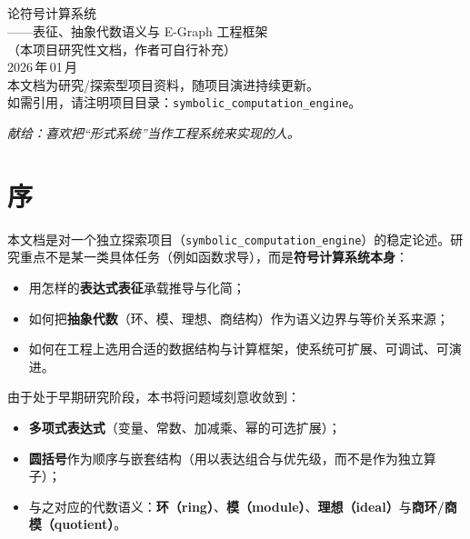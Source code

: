 \documentclass[12pt,openany]{book}
\title{\Huge \BookTitle\\[6pt]\large \BookSubtitle}
\author{\BookAuthor}
\date{\BookDate}
\newcommand{\BookTitle}{论符号计算系统}
\newcommand{\BookSubtitle}{——表征、抽象代数语义与 E-Graph 工程框架}
\newcommand{\BookAuthor}{（本项目研究性文档，作者可自行补充）}
\newcommand{\BookDate}{2026\,年\,01\,月}
\begin{document}
\frontmatter
\maketitle

\cleardoublepage
\thispagestyle{empty}
\begin{center}
  \vspace*{0.25\textheight}
  {\Large \BookTitle}\\[10pt]
  {\BookSubtitle}\\[20pt]
  {\BookAuthor}\\[10pt]
  {\BookDate}\\[20pt]
  \vfill
  \small
  本文档为研究/探索型项目资料，随项目演进持续更新。\\
  如需引用，请注明项目目录：\texttt{symbolic\_computation\_engine}。
\end{center}

\cleardoublepage
\thispagestyle{empty}
\begin{center}
  \vspace*{0.35\textheight}
  \emph{献给：喜欢把“形式系统”当作工程系统来实现的人。}
\end{center}

\cleardoublepage
\chapter*{序}

本文档是对一个独立探索项目（\texttt{symbolic\_computation\_engine}）的稳定论述。研究重点不是某一类具体任务（例如函数求导），而是\textbf{符号计算系统本身}：

\begin{itemize}
  \item 用怎样的\textbf{表达式表征}承载推导与化简；
  \item 如何把\textbf{抽象代数}（环、模、理想、商结构）作为语义边界与等价关系来源；
  \item 如何在工程上选用合适的数据结构与计算框架，使系统可扩展、可调试、可演进。
\end{itemize}

由于处于早期研究阶段，本书将问题域刻意收敛到：

\begin{itemize}
  \item \textbf{多项式表达式}（变量、常数、加减乘、幂的可选扩展）；
  \item \textbf{圆括号}作为顺序与嵌套结构（用以表达组合与优先级，而不是作为独立算子）；
  \item 与之对应的代数语义：\textbf{环（ring）}、\textbf{模（module）}、\textbf{理想（ideal）}与\textbf{商环/商模（quotient）}。
\end{itemize}
\end{document}
